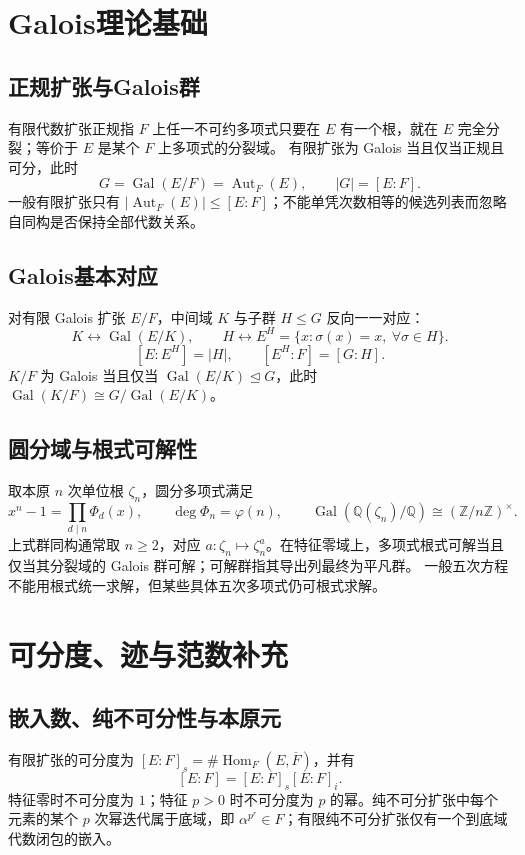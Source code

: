 \documentclass[../main.tex]{subfiles}
\begin{document}
\section{Galois理论基础}
\subsection{正规扩张与Galois群}
有限代数扩张正规指 $F$ 上任一不可约多项式只要在 $E$ 有一个根，就在 $E$ 完全分裂；等价于 $E$ 是某个 $F$ 上多项式的分裂域。
有限扩张为 Galois 当且仅当正规且可分，此时
\[
G=\operatorname{Gal}(E/F)=\operatorname{Aut}_F(E),\qquad |G|=[E:F].
\]
一般有限扩张只有 $|\operatorname{Aut}_F(E)|\le[E:F]$；不能单凭次数相等的候选列表而忽略自同构是否保持全部代数关系。
\subsection{Galois基本对应}
对有限 Galois 扩张 $E/F$，中间域 $K$ 与子群 $H\le G$ 反向一一对应：
\[
K\longleftrightarrow\operatorname{Gal}(E/K),\qquad
H\longleftrightarrow E^H=\{x:\sigma(x)=x,\ \forall\sigma\in H\}.
\]
\[
[E:E^H]=|H|,\qquad[E^H:F]=[G:H].
\]
$K/F$ 为 Galois 当且仅当 $\operatorname{Gal}(E/K)\trianglelefteq G$，此时 $\operatorname{Gal}(K/F)\cong G/\operatorname{Gal}(E/K)$。
\subsection{圆分域与根式可解性}
取本原 $n$ 次单位根 $\zeta_n$，圆分多项式满足
\[
x^n-1=\prod_{d\mid n}\Phi_d(x),\qquad
\deg\Phi_n=\varphi(n),\qquad
\operatorname{Gal}(\mathbb Q(\zeta_n)/\mathbb Q)\cong(\mathbb Z/n\mathbb Z)^\times.
\]
上式群同构通常取 $n\ge2$，对应 $a:\zeta_n\mapsto\zeta_n^a$。在特征零域上，多项式根式可解当且仅当其分裂域的 Galois 群可解；可解群指其导出列最终为平凡群。
一般五次方程不能用根式统一求解，但某些具体五次多项式仍可根式求解。
\section{可分度、迹与范数补充}
\subsection{嵌入数、纯不可分性与本原元}
有限扩张的可分度为 $[E:F]_s=\#\operatorname{Hom}_F(E,\overline F)$，并有
\[
[E:F]=[E:F]_s[E:F]_i.
\]
特征零时不可分度为 $1$；特征 $p>0$ 时不可分度为 $p$ 的幂。纯不可分扩张中每个元素的某个 $p$ 次幂迭代属于底域，即 $\alpha^{p^r}\in F$；有限纯不可分扩张仅有一个到底域代数闭包的嵌入。
\end{document}
